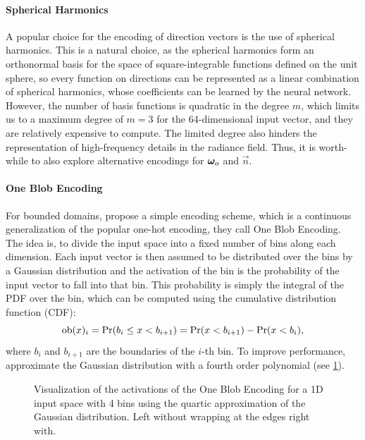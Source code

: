 \paragraph{Spherical Harmonics}
A popular choice for the encoding of direction vectors is the use of spherical harmonics.
This is a natural choice, as the spherical harmonics form an orthonormal basis for the space of square-integrable functions defined on the unit sphere, so every function on directions can be represented as a linear combination of spherical harmonics, whose coefficients can be learned by the neural network.
However, the number of basis functions is quadratic in the degree $m$, which limits us to a maximum degree of $m=3$ for the 64-dimensional input vector, and they are relatively expensive to compute.
The limited degree also hinders the representation of high-frequency details in the radiance field.
Thus, it is worth-while to also explore alternative encodings for ${\bm{\omega}_o}$ and $\vec{n}$.

\paragraph{One Blob Encoding}
For bounded domains, \textcite{muller2019} propose a simple encoding scheme, which is a continuous generalization of the popular one-hot encoding, they call One Blob Encoding.
The idea is, to divide the input space into a fixed number of bins along each dimension.
Each input vector is then assumed to be distributed over the bins by a Gaussian distribution and the activation of the bin is the probability of the input vector to fall into that bin.
This probability is simply the integral of the PDF over the bin, which can be computed using the cumulative distribution function (CDF):
\begin{equation}
    \mathrm{ob}(x)_i = \mathrm{Pr}(b_i \leq x < b_{i+1}) = \mathrm{Pr}(x < b_{i+1}) - \mathrm{Pr}(x < b_i),
\end{equation}
where $b_i$ and $b_{i+1}$ are the boundaries of the $i$-th bin.
To improve performance, \textcite{muller2021} approximate the Gaussian distribution with a fourth order polynomial (see \cref{fig:oneblob}).

\begin{figure}[htb!]
    \centering
    \begin{subfigure}{0.5\textwidth}
        \centering
        
    \end{subfigure}%
    \begin{subfigure}{0.5\textwidth}
        \centering
        
    \end{subfigure}
    \caption{Visualization of the activations of the One Blob Encoding for a 1D input space with 4 bins using the quartic approximation of the Gaussian distribution. Left without wrapping at the edges right with.}
    \label{fig:oneblob}
\end{figure}

